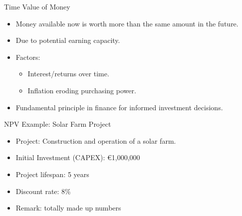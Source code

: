 \begin{frame}{Time Value of Money}
  \begin{itemize}
    \item Money available now is worth more than the same amount in the future.
    \item Due to potential earning capacity.
    \item Factors:
      \begin{itemize}
        \item Interest/returns over time.
        \item Inflation eroding purchasing power.
      \end{itemize}
    \item Fundamental principle in finance for informed investment decisions.
  \end{itemize}
\end{frame}

\begin{frame}{NPV Example: Solar Farm Project}
  \begin{itemize}
    \item Project: Construction and operation of a  solar farm.
    \item Initial Investment (CAPEX): €1,000,000
    \item Project lifespan: 5 years
    \item Discount rate: 8\%
    \item Remark: totally made up numbers
  \end{itemize}
\end{frame}

